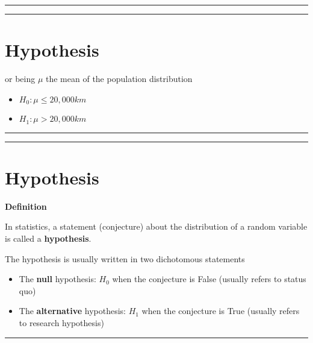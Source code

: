 \documentclass[
]{book}
\providecommand{\tightlist}{%
  \setlength{\itemsep}{0pt}\setlength{\parskip}{0pt}}
\begin{document}
\begin{center}\rule{0.5\linewidth}{0.5pt}\end{center}

\begin{center}\rule{0.5\linewidth}{0.5pt}\end{center}

\hypertarget{hypothesis-3}{%
\section{Hypothesis}\label{hypothesis-3}}

or being \(\mu\) the mean of the population distribution

\begin{itemize}
\tightlist
\item
  \(H_0: \mu \leq 20,000km\)
\item
  \(H_1: \mu > 20,000km\)
\end{itemize}

\begin{center}\rule{0.5\linewidth}{0.5pt}\end{center}

\begin{center}\rule{0.5\linewidth}{0.5pt}\end{center}

\hypertarget{hypothesis-4}{%
\section{Hypothesis}\label{hypothesis-4}}

\textbf{Definition}

In statistics, a statement (conjecture) about the distribution of a random variable is called a \textbf{hypothesis}.

The hypothesis is usually written in two dichotomous statements

\begin{itemize}
\tightlist
\item
  The \textbf{null} hypothesis: \(H_0\) when the conjecture is False (usually refers to status quo)
\item
  The \textbf{alternative} hypothesis: \(H_1\) when the conjecture is True (usually refers to research hypothesis)
\end{itemize}

\begin{center}\rule{0.5\linewidth}{0.5pt}\end{center}
\end{document}
